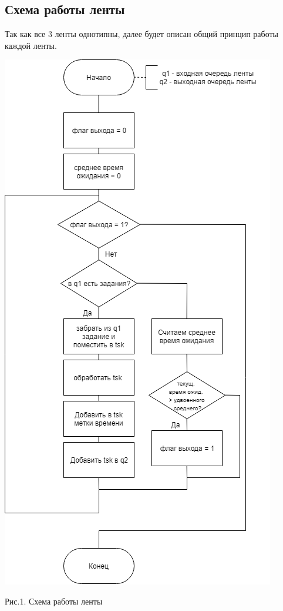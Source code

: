 \documentclass[12pt]{report}
\begin{document}
	\subsection{Схема работы ленты}
	
	Так как все 3 ленты однотипны, далее будет описан общий принцип работы каждой ленты.
	
	\begin{center}
		\includegraphics[scale=0.5]{tape.png}
		
		Рис.1. Схема работы ленты
	\end{center}
\end{document}

